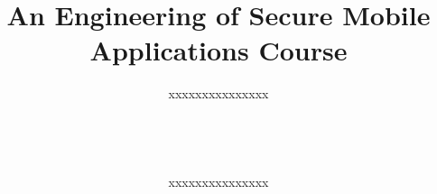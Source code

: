 \documentclass{sig-alternate}
\newif\ifisnopii
\begin{document}
\title{An Engineering of Secure Mobile Applications Course}



%
\ifisnopii %
\author{
%
\alignauthor
Daniel~E.~Krutz~\&~Samuel~A.~Malachowsky\\ 	
	\affaddr{Software Engineering Department}\\
       \affaddr{Rochester Institute of Technology}\\
       \affaddr{1 Lomb Memorial Drive}\\
       \affaddr{Rochester, NY, USA} \\
       \email{\{dxkvse, samvse\}@rit.edu}
       \alignauthor
Ronald M. Krawitz\\
        \affaddr{Applied Technology Department}\\
       \affaddr{Curry College}\\
        \affaddr{1071 Blue Hill Ave}\\
       \affaddr{Milton, MA USA} \\
       \email{Rkrawitz0712@curry.edu}
} %

\else %
\author{
%
\alignauthor
xxxxxxxxxxxxxxx\\ 	
	\\
       \\
       \\
        \\
       \alignauthor
xxxxxxxxxxxxxxx\\
        \\
       \\
        \\
        \\
} %
\fi %
\end{document}
